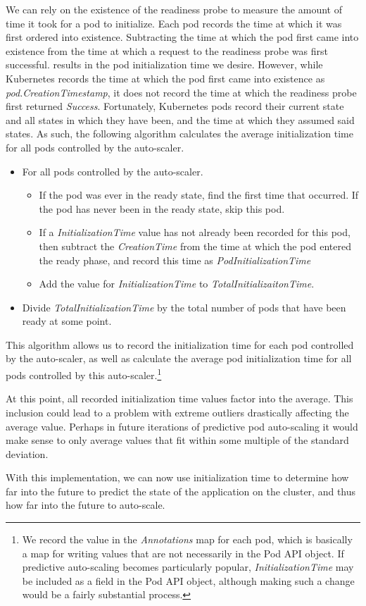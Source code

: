 We can rely on the existence of the readiness probe to
measure the amount of time it took for a pod
to initialize. Each pod records the time at which it was first ordered into
existence. Subtracting the time at which the pod first came into existence
from the time at which a request to the readiness probe was first successful.
results in the pod initialization time we desire. However, while Kubernetes
records the time at which the pod first came into existence as
\textit{pod.CreationTimestamp}, it does not record the time at which the
readiness probe first returned \textit{Success}. Fortunately, Kubernetes pods
record their current state and all states in which they have been, and the time
at which they assumed said states. As such, the following algorithm
calculates the average initialization time for all pods controlled by the auto-scaler.

\begin{itemize}
  \item For all pods controlled by the auto-scaler.
    \begin{itemize}
      \item If the pod was ever in the ready state, find the first time that
        occurred. If the pod has never been in the ready state, skip this pod.
      \item If a \textit{InitializationTime} value has not already been recorded for
        this pod, then subtract the \textit{CreationTime} from the time at which the
        pod entered the ready phase, and record this time as
        \textit{PodInitializationTime}
      \item Add the value for \textit{InitializationTime} to
        \textit{TotalInitializaitonTime}.
      \end{itemize}
    \item Divide \textit{TotalInitializationTime} by the total number of pods that
      have been ready at some point.
\end{itemize}

This algorithm allows us to record the initialization time for each pod
controlled by the auto-scaler, as well as calculate the average pod
initialization time for all pods controlled by this auto-scaler.\footnote{We
record the value in the \textit{Annotations} map for each pod,
which is basically a map for writing
values that are not necessarily in the Pod API object. If predictive
auto-scaling becomes particularly popular, \textit{InitializationTime} may be
included as a field in the Pod API object, although making such a change would
be a fairly substantial process.}

At this point, all recorded initialization time values factor into the average.
This inclusion could lead to a problem with extreme outliers drastically
affecting the average value. Perhaps in future iterations of predictive pod
auto-scaling it would make sense to only average values that fit within some
multiple of the standard deviation.

With this implementation, we can now use initialization time to determine how
far into the future to predict the state of the application on the cluster, and
thus how far into the future to auto-scale.
